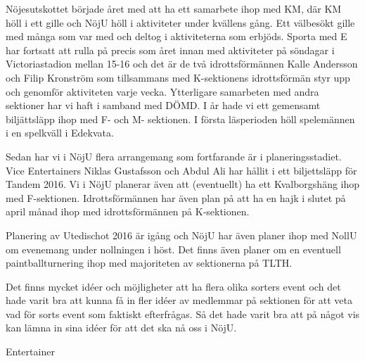 \documentclass[../_main/handlingar.tex]{subfiles}
\begin{document}

Nöjesutskottet började året med att ha ett samarbete ihop med KM, där KM höll i ett gille och NöjU höll i aktiviteter under kvällens gång. Ett välbesökt gille med många som var med och deltog i aktiviteterna som erbjöds. Sporta med E har fortsatt att rulla på precis som året innan med aktiviteter på söndagar i Victoriastadion mellan 15-16 och det är de två idrottsförmännen Kalle Andersson och Filip Kronström som tillsammans med K-sektionens idrottsförmän styr upp och genomför aktiviteten varje vecka. Ytterligare samarbeten med andra sektioner har vi haft i samband med DÖMD. I år hade vi ett gemensamt biljättsläpp ihop med F- och M- sektionen. I första läsperioden höll spelemännen i en spelkväll i Edekvata.

Sedan har vi i NöjU flera arrangemang som fortfarande är i planeringsstadiet. Vice Entertainers Niklas Gustafsson och Abdul Ali har hållit i ett biljettsläpp för Tandem 2016. Vi i NöjU planerar även att (eventuellt) ha ett Kvalborgshäng ihop med F-sektionen. Idrottsförmännen har även plan på att ha en hajk i slutet på april månad ihop med idrottsförmännen på K-sektionen.

Planering av Utedischot 2016 är igång och NöjU har även planer ihop med NollU om evenemang under nollningen i höst. Det finns även planer om en eventuell paintballturnering ihop med majoriteten av sektionerna på TLTH.

Det finns mycket idéer och möjligheter att ha flera olika sorters event och det hade varit bra att kunna få in fler idéer av medlemmar på sektionen för att veta vad för sorts event som faktiskt efterfrågas. Så det hade varit bra att på något vis kan lämna in sina idéer för att det ska nå oss i NöjU.

\begin{signatures}{1}
    \mvh
    \signature{Dalia Khairallah}{Entertainer}
\end{signatures}
\end{document}
